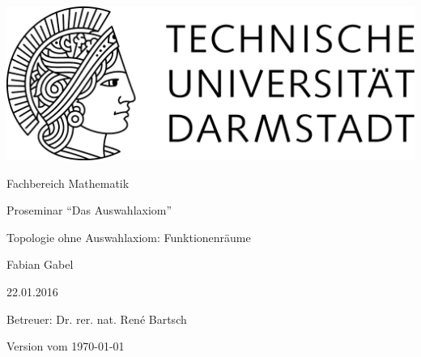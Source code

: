 \begin{titlepage}
  \begin{center}
    \vspace{1cm}
    \includegraphics[width=0.5\linewidth]{TU_Darmstadt_Logo.pdf}
    \vspace{12pt}
    
    \large{Fachbereich Mathematik}
    \vspace{2cm}
    
    \large{Proseminar ``Das Auswahlaxiom''}
    \vspace{2cm}

    \huge{Topologie ohne Auswahlaxiom: Funktionenräume}
    \vspace*{2cm}    
    
		\large
    Fabian Gabel
    \vspace*{.5cm}

    22.01.2016 \\
    \vspace*{1cm}

    Betreuer: Dr. rer. nat. René Bartsch

    \vspace*{.5cm}

    \tiny{Version vom \today}
  \end{center}
\end{titlepage}
\vspace*{\fill}
